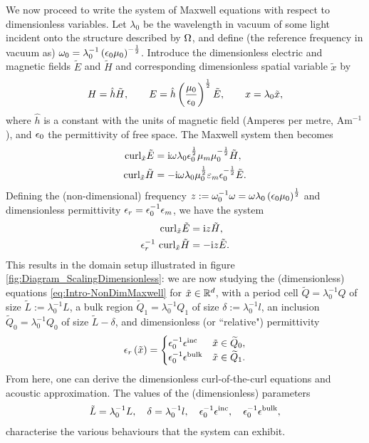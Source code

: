 We now proceed to write the system of Maxwell equations with respect to dimensionless variables.
Let $\lambda_0$ be the wavelength in vacuum of some light incident onto the structure described by $\Omega$, and define (the reference frequency in vacuum as) $\omega_0 = \lambda_0^{-1}\left( \epsilon_0\mu_0 \right)^{-\frac{1}{2}}$.
Introduce the dimensionless electric and magnetic fields $\tilde{E}$ and $\tilde{H}$ and corresponding dimensionless spatial variable $\tilde{x}$ by
\begin{align*}
	H = \hat{h}\tilde{H}, 
	\qquad E = \hat{h}\left( \frac{\mu_0}{\epsilon_0} \right)^{\frac{1}{2}}\tilde{E},
	\qquad x = \lambda_0\tilde{x},
\end{align*}
where $\hat{h}$ is a constant with the units of magnetic field (Amperes per metre, $\mathrm{A}\mathrm{m}^{-1}$), and $\epsilon_0$ the permittivity of free space.
The Maxwell system then becomes
\begin{align*}
	\mathrm{curl}_{\tilde{x}}\tilde{E} 
	&= \mathrm{i}\omega\lambda_0\epsilon_0^{\frac{1}{2}}\mu_m\mu_0^{-\frac{1}{2}} \tilde{H}, \\
	\mathrm{curl}_{\tilde{x}}\tilde{H} 
	&= -\mathrm{i}\omega\lambda_0\mu_0^{\frac{1}{2}}\varepsilon_m\epsilon_0^{-\frac{1}{2}} \tilde{E}.
\end{align*}
Defining the (non-dimensional) frequency $z := \omega_0^{-1}\omega = \omega\lambda_0\left( \epsilon_0\mu_0 \right)^{\frac{1}{2}}$ and dimensionless permittivity $\epsilon_{r}=\epsilon_0^{-1}\epsilon_m$, we have the system
\begin{align} \label{eq:Intro-NonDimMaxwell}
	\mathrm{curl}_{\tilde{x}}\tilde{E} 
	&= \mathrm{i} z \tilde{H}, \\
	\epsilon^{-1}_{r} \ \mathrm{curl}_{\tilde{x}}\tilde{H} 
	&= -\mathrm{i} z \tilde{E}.
\end{align}
This results in the domain setup illustrated in figure \ref{fig:Diagram_ScalingDimensionless}: we are now studying the (dimensionless) equations \eqref{eq:Intro-NonDimMaxwell} for $\tilde{x}\in\mathbb{R}^d$, with a period cell $\widetilde{Q} = \lambda_0^{-1}Q$ of size $\tilde{L}:=\lambda_0^{-1}L$, a bulk region $\widetilde{Q}_1 = \lambda_0^{-1}Q_1$ of size $\delta:=\lambda_0^{-1}l$, an inclusion $\widetilde{Q}_0 = \lambda_0^{-1}Q_0$ of size $\tilde{L}-\delta$, and dimensionless (or ``relative") permittivity
\begin{align*}
	\epsilon_{r}\left( \tilde{x} \right) = 
	\begin{cases} 
		\epsilon_0^{-1}\epsilon^{\mathrm{inc}} & \tilde{x}\in\widetilde{Q}_0, \\
		\epsilon_0^{-1}\epsilon^{\mathrm{bulk}} & \tilde{x}\in\widetilde{Q}_1.
	\end{cases}
\end{align*}
From here, one can derive the dimensionless curl-of-the-curl equations and acoustic approximation.
The values of the (dimensionless) parameters
\begin{align*}
	\tilde{L} = \lambda_0^{-1}L, \quad
	\delta = \lambda_0^{-1}l, \quad
	\epsilon_0^{-1}\epsilon^{\mathrm{inc}}, \quad
	\epsilon_0^{-1}\epsilon^{\mathrm{bulk}},
\end{align*}
characterise the various behaviours that the system can exhibit.

